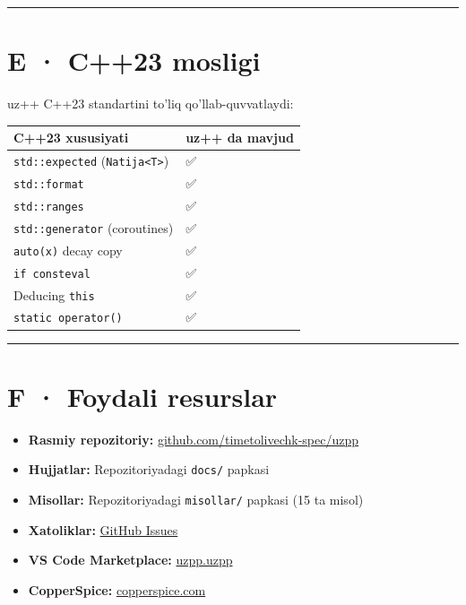 \documentclass[a4paper,11pt,twoside,openright]{book}
\providecommand{\tightlist}{%
  \setlength{\itemsep}{0pt}\setlength{\parskip}{0pt}}
\begin{document}
\begin{center}\rule{0.5\linewidth}{0.5pt}\end{center}

\section{E · C++23 mosligi}\label{e-c23-mosligi}

uz++ C++23 standartini to'liq qo'llab-quvvatlaydi:

\begin{longtable}[]{@{}ll@{}}
\toprule\noalign{}
C++23 xususiyati & uz++ da mavjud \\
\midrule\noalign{}
\endhead
\bottomrule\noalign{}
\endlastfoot
\texttt{std::expected} (\texttt{Natija\textless{}T\textgreater{}}) & ✅ \\
\texttt{std::format} & ✅ \\
\texttt{std::ranges} & ✅ \\
\texttt{std::generator} (coroutines) & ✅ \\
\texttt{auto(x)} decay copy & ✅ \\
\texttt{if\ consteval} & ✅ \\
Deducing \texttt{this} & ✅ \\
\texttt{static\ operator()} & ✅ \\
\end{longtable}

\begin{center}\rule{0.5\linewidth}{0.5pt}\end{center}

\section{F · Foydali resurslar}\label{f-foydali-resurslar}

\begin{itemize}
\tightlist
\item
  \textbf{Rasmiy repozitoriy:}
  \href{https://github.com/timetolivechk-spec/uzpp}{github.com/timetolivechk-spec/uzpp}
\item
  \textbf{Hujjatlar:} Repozitoriyadagi \texttt{docs/} papkasi
\item
  \textbf{Misollar:} Repozitoriyadagi \texttt{misollar/} papkasi (15 ta misol)
\item
  \textbf{Xatoliklar:}
  \href{https://github.com/timetolivechk-spec/uzpp/issues}{GitHub Issues}
\item
  \textbf{VS Code Marketplace:}
  \href{https://marketplace.visualstudio.com/items?itemName=uzpp.uzpp}{uzpp.uzpp}
\item
  \textbf{CopperSpice:} \href{https://www.copperspice.com/}{copperspice.com}
\end{itemize}
\end{document}
